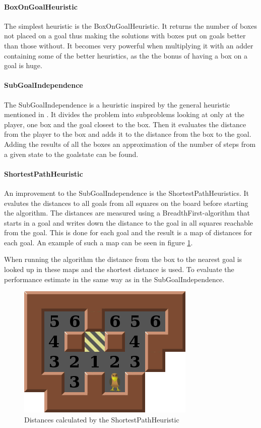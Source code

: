 \paragraph{BoxOnGoalHeuristic}The simplest heuristic is the BoxOnGoalHeuristic. It returns the number of boxes not placed on a goal thus making the solutions with boxes put on goals better than those without. It becomes very powerful when multiplying it with an adder containing some of the better heuristics, as the the bonus of having a box on a goal is huge.

\paragraph{SubGoalIndependence}The SubGoalIndependence is a heuristic inspired by the general heuristic mentioned in \citet{Russell2003GeneralHeuristics}. It divides the problem into subproblems looking at only at the player, one box and the goal closest to the box. Then it evaluates the distance from the player to the box and adds it to the distance from the box to the goal. Adding the results of all the boxes an approximation of the number of steps from a given state to the goalstate can be found.

\paragraph{ShortestPathHeuristic}An improvement to the SubGoalIndependence is the ShortestPathHeuristics. It evalutes the distances to all goals from all squares on the board before starting the \astar algorithm. The distances are measured using a BreadthFirst-algorithm that starts in a goal and writes down the distance to the goal in all squares reachable from the goal. This is done for each goal and the result is a map of distances for each goal. An example of such a map can be seen in figure \ref{fig:shortestpathheuristic}.

When running the algorithm the distance from the box to the nearest goal is looked up in these maps and the shortest distance is used. To evaluate the performance estimate in the same way as in the SubGoalIndependence.
\begin{figure}[htp]
	\centering
	\includegraphics[scale=0.5]{img/src/shortestpathheuristic.png}
	\caption{Distances calculated by the ShortestPathHeuristic}
	\label{fig:shortestpathheuristic}
\end{figure}

